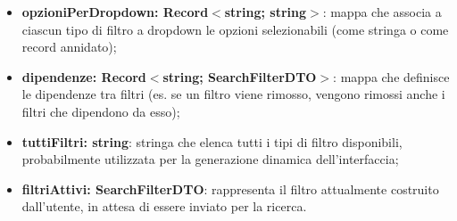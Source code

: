 \documentclass[a4paper,12pt]{article}
\begin{document}
{{{{\begin{itemize}
                    \item \textbf{opzioniPerDropdown: Record$<$string; string$>$}: mappa che associa a ciascun tipo di filtro a dropdown le opzioni selezionabili (come stringa o come record annidato);
                    \item \textbf{dipendenze: Record$<$string; SearchFilterDTO$>$}: mappa che definisce le dipendenze tra filtri (es. se un filtro viene rimosso, vengono rimossi anche i filtri che dipendono da esso);
                    \item \textbf{tuttiFiltri: string}: stringa che elenca tutti i tipi di filtro disponibili, probabilmente utilizzata per la generazione dinamica dell'interfaccia;
                    \item \textbf{filtriAttivi: SearchFilterDTO}: rappresenta il filtro attualmente costruito dall'utente, in attesa di essere inviato per la ricerca.
                \end{itemize}
                
}}}}
\end{document}
